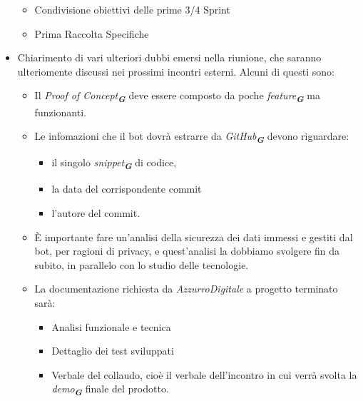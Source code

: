 \begin{itemize}
\begin{itemize}
        \item Condivisione obiettivi delle prime 3/4 Sprint
        \item Prima Raccolta Specifiche
    \end{itemize}
    \item Chiarimento di vari ulteriori dubbi emersi nella riunione, che saranno ulteriomente discussi nei prossimi incontri esterni. Alcuni di questi sono:
    \begin{itemize}
        \item Il \emph{Proof of Concept}\textsubscript{\textit{\textbf{G}}} deve essere composto da poche \emph{feature}\textsubscript{\textit{\textbf{G}}} 
        ma funzionanti.
        \item Le infomazioni che il bot dovrà estrarre da \emph{GitHub}\textsubscript{\textit{\textbf{G}}} devono riguardare:
        \begin{itemize}
            \item il singolo \emph{snippet}\textsubscript{\textit{\textbf{G}}} di codice,
            \item la data del corrispondente commit
            \item l'autore del commit.
        \end{itemize}
        \item È importante fare un'analisi della sicurezza dei dati immessi e gestiti dal bot, per ragioni di privacy, e quest'analisi la dobbiamo svolgere fin da
        subito, in parallelo con lo studio delle tecnologie.
        \item La documentazione richiesta da \emph{AzzurroDigitale} a progetto terminato sarà:
        \begin{itemize}
            \item Analisi funzionale e tecnica
            \item Dettaglio dei test sviluppati
            \item Verbale del collaudo, cioè il verbale dell'incontro in cui verrà svolta la \emph{demo}\textsubscript{\textit{\textbf{G}}} finale del prodotto.
        \end{itemize}
    \end{itemize}
\end{itemize}